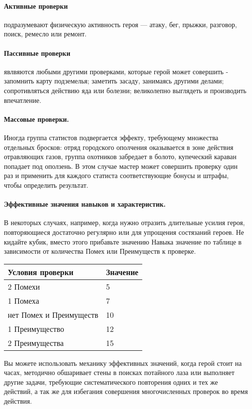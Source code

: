 \paragraph{Активные проверки} подразумевают физическую активность героя — атаку, бег, прыжки, разговор, поиск, ремесло или ремонт.
\paragraph{Пассивные проверки} явлвяются любыми другими проверками, которые герой может совершить - запомнить карту подземелья; заметить засаду, занимаясь другими делами; сопротивляться действию яда или болезни; великолепно выглядеть и производить впечатление.
{\paragraph{Массовые проверки.} Иногда группа статистов подвергается эффекту, требующему множества отдельных бросков: отряд городского ополчения оказывается в зоне действия отравляющих газов, группа охотников забредает в болото, купеческий караван попадает под оползень. В этом случае мастер может совершить проверку один раз и применить для каждого статиста соответствующие бонусы и штрафы, чтобы определить результат.
\paragraph{Эффективные значения навыков и характеристик.} В некоторых случаях, например, когда нужно отразить длительные усилия героя, повторяющиеся достаточно регулярно или для упрощения состязаний героев. Не кидайте кубик, вместо этого прибавьте значению Навыка значение по таблице в зависимости от количества Помех или Преимуществ к проверке.
\begin{center}
\begin{tabular}{|l|l|}
\hline
Условия проверки & Значение \\ \hline
2 Помехи & 5 \\ \hline
1 Помеха & 7 \\ \hline
нет Помех и Преимуществ & 10 \\ \hline
1 Преимущество & 12 \\ \hline
2 Преимущества & 15 \\ \hline
\end{tabular}
\end{center}
Вы можете использовать механику эффективных значений, когда герой стоит на часах, методично обшаривает стены в поисках потайного лаза или выполняет другие задачи, требующие систематического повторения одних и тех же действий, а так же для избегания совершения многочисленных проверок во время действия.
}
